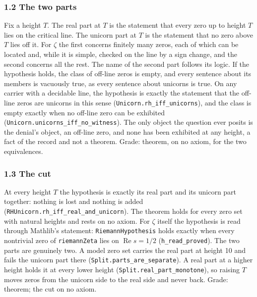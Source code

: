 \documentclass[10pt]{article}
\begin{document}
\hypertarget{the-two-parts}{%
\subsubsection{1.2 The two parts}\label{the-two-parts}}

Fix a height \(T\). The real part at \(T\) is the statement that every
zero up to height \(T\) lies on the critical line. The unicorn part at
\(T\) is the statement that no zero above \(T\) lies off it. For
\(\zeta\) the first concerns finitely many zeros, each of which can be
located and, while it is simple, checked on the line by a sign change,
and the second concerns all the rest. The name of the second part
follows its logic. If the hypothesis holds, the class of off-line zeros
is empty, and every sentence about its members is vacuously true, as
every sentence about unicorns is true. On any carrier with a decidable
line, the hypothesis is exactly the statement that the off-line zeros
are unicorns in this sense
(\texttt{Unicorn.\allowbreak{}rh\_\allowbreak{}iff\_\allowbreak{}unicorns}),
and the class is empty exactly when no off-line zero can be exhibited
(\texttt{Unicorn.\allowbreak{}unicorns\_\allowbreak{}iff\_\allowbreak{}no\_\allowbreak{}witness}).
The only object the question ever posits is the denial's object, an
off-line zero, and none has been exhibited at any height, a fact of the
record and not a theorem. Grade: theorem, on no axiom, for the two
equivalences.

\hypertarget{the-cut}{%
\subsubsection{1.3 The cut}\label{the-cut}}

At every height \(T\) the hypothesis is exactly its real part and its
unicorn part together: nothing is lost and nothing is added
(\texttt{RHUnicorn.\allowbreak{}rh\_\allowbreak{}iff\_\allowbreak{}real\_\allowbreak{}and\_\allowbreak{}unicorn}).
The theorem holds for every zero set with natural heights and rests on
no axiom. For \(\zeta\) itself the hypothesis is read through Mathlib's
statement: \texttt{RiemannHypothesis} holds exactly when every
nontrivial zero of \texttt{riemannZeta} lies on
\(\operatorname{Re} s = 1/2\)
(\texttt{h\_\allowbreak{}read\_\allowbreak{}proved}). The two parts are
genuinely two. A model zero set carries the real part at height 10 and
fails the unicorn part there
(\texttt{Split.\allowbreak{}parts\_\allowbreak{}are\_\allowbreak{}separate}).
A real part at a higher height holds it at every lower height
(\texttt{Split.\allowbreak{}real\_\allowbreak{}part\_\allowbreak{}monotone}),
so raising \(T\) moves zeros from the unicorn side to the real side and
never back. Grade: theorem; the cut on no axiom.
\end{document}
